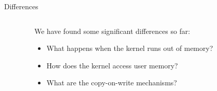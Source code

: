 \documentclass[aspectratio=169]{beamer}
\newcommand{\bi}{\begin{itemize}}
\newcommand{\ei}{\end{itemize}}
\begin{document}
\begin{frame}{Differences}
  \begin{columns}[T]
    \begin{column}{0.2\textwidth}
    \end{column}
    \begin{column}{0.6\textwidth}
      We have found some significant differences so far:
      \bi
      \pause
    \item What happens when the kernel runs out of memory?
      \pause
    \item How does the kernel access user memory?
      \pause
    \item What are the copy-on-write mechanisms?
      \ei
    \end{column}
    \begin{column}{0.2\textwidth}
    \end{column}
  \end{columns}
\end{frame}
\end{document}
